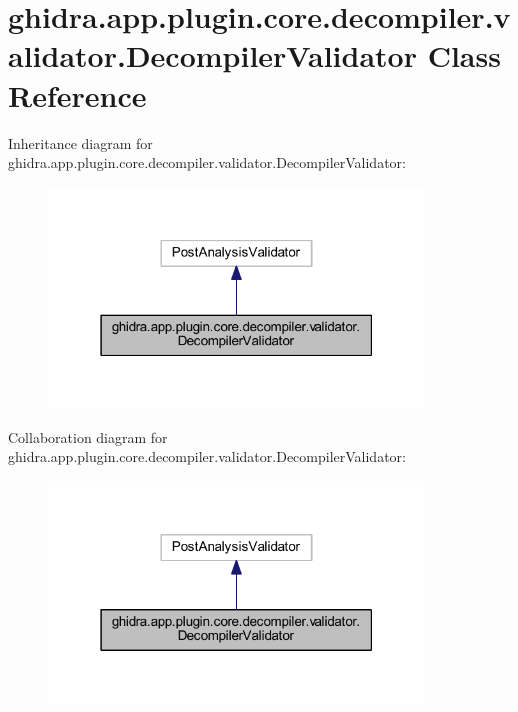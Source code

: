 \hypertarget{classghidra_1_1app_1_1plugin_1_1core_1_1decompiler_1_1validator_1_1_decompiler_validator}{}\section{ghidra.\+app.\+plugin.\+core.\+decompiler.\+validator.\+Decompiler\+Validator Class Reference}
\label{classghidra_1_1app_1_1plugin_1_1core_1_1decompiler_1_1validator_1_1_decompiler_validator}


Inheritance diagram for ghidra.\+app.\+plugin.\+core.\+decompiler.\+validator.\+Decompiler\+Validator\+:
\nopagebreak
\begin{figure}[H]
\begin{center}
\leavevmode
\includegraphics[width=283pt]{classghidra_1_1app_1_1plugin_1_1core_1_1decompiler_1_1validator_1_1_decompiler_validator__inherit__graph}
\end{center}
\end{figure}


Collaboration diagram for ghidra.\+app.\+plugin.\+core.\+decompiler.\+validator.\+Decompiler\+Validator\+:
\nopagebreak
\begin{figure}[H]
\begin{center}
\leavevmode
\includegraphics[width=283pt]{classghidra_1_1app_1_1plugin_1_1core_1_1decompiler_1_1validator_1_1_decompiler_validator__coll__graph}
\end{center}
\end{figure}
